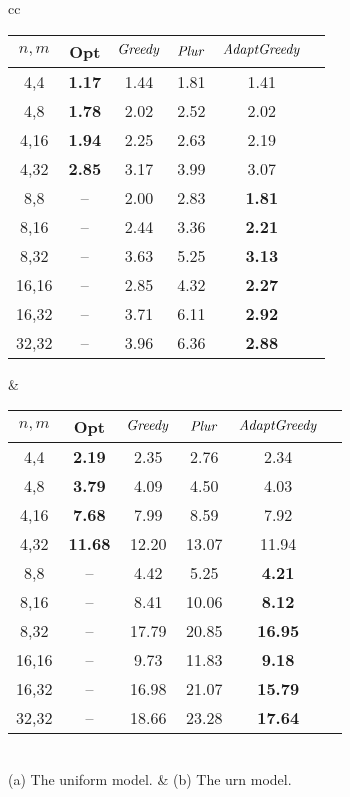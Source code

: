 \documentclass{ecai2012}
\newcommand{\plurshort}{\mbox{\emph{Plur}}\xspace}
\newcommand{\bordashort}{\mbox{\emph{Greedy}}\xspace}
\newcommand{\bordaplurshort}{\mbox{\emph{AdaptGreedy}}\xspace}
\begin{document}
\begin{table*}[htp]
  \centering
  \begin{tabular}{cc}
\begin{tabular}{|c|c|c|c|c|c|}
\hline
$n,m$ & Opt & $\bordashort$ & $\plurshort$ & $\bordaplurshort$   \\
\hline
\hline
  4,4& \textbf{1.17 } & 1.44  & 1.81  & 1.41  \\
  4,8& \textbf{1.78 } & 2.02  & 2.52  & 2.02  \\
  4,16& \textbf{1.94 } & 2.25  & 2.63  & 2.19  \\
  4,32& \textbf{2.85 } & 3.17  & 3.99  & 3.07  \\
  8,8& -- & 2.00  & 2.83  & \textbf{1.81 } \\
  8,16& -- & 2.44  & 3.36  & \textbf{2.21 } \\
  8,32& -- & 3.63  & 5.25  & \textbf{3.13 } \\
  16,16& -- & 2.85  & 4.32  & \textbf{2.27 } \\
  16,32& -- & 3.71  & 6.11  & \textbf{2.92 } \\
  32,32& -- & 3.96  & 6.36  & \textbf{2.88 } \\
\hline
\end{tabular} & \begin{tabular}{|c|c|c|c|c|c|}
\hline
$n,m$ & Opt & $\bordashort$ & $\plurshort$ & $\bordaplurshort$   \\
\hline
\hline
  4,4& \textbf{2.19 } & 2.35  & 2.76  & 2.34  \\
  4,8& \textbf{3.79 } & 4.09  & 4.50  & 4.03  \\
  4,16& \textbf{7.68 } & 7.99  & 8.59  & 7.92  \\
  4,32& \textbf{11.68 } & 12.20  & 13.07  & 11.94  \\
  8,8& -- & 4.42  & 5.25  & \textbf{4.21 } \\
  8,16& -- & 8.41  & 10.06  & \textbf{8.12 } \\
  8,32& -- & 17.79  & 20.85  & \textbf{16.95 } \\
  16,16& -- & 9.73  & 11.83  & \textbf{9.18 } \\
  16,32& -- & 16.98  & 21.07  & \textbf{15.79 } \\
  32,32& -- & 18.66  & 23.28  & \textbf{17.64 } \\
\hline
\end{tabular}\\ (a) The uniform model. & (b) The urn  model.
\end{tabular}
\caption{\label{t:t1} Experiments on randomly generated profiles: average
number of required manipulators.} 
\end{table*}
\end{document}
